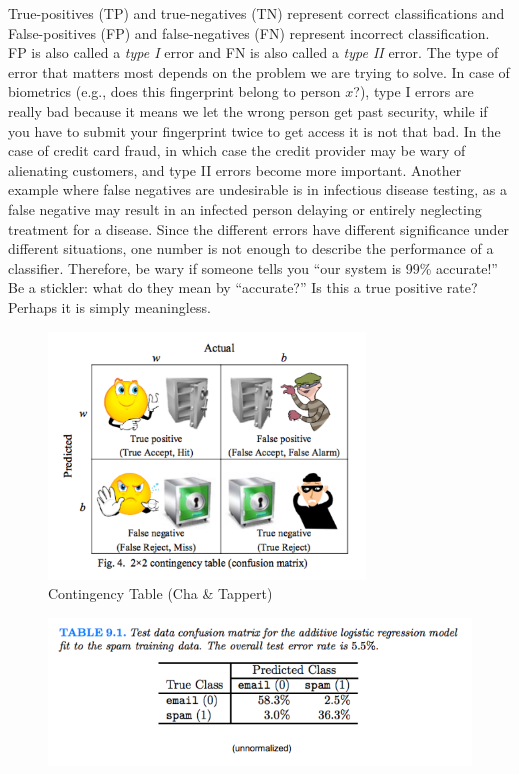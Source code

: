 \documentclass[a4paper]{article}
\begin{document}
True-positives (TP) and true-negatives (TN) represent correct classifications and False-positives (FP) and false-negatives (FN) represent incorrect classification. FP is also called a \textit{type I} error and FN is also called a \textit{type II} error. The type of error that matters most depends on the problem we are trying to solve. In case of biometrics (e.g., does this fingerprint belong to person $x$?), type I errors are really bad because it means we let the wrong person get past security, while if you have to submit your fingerprint twice to get access it is not that bad. In the case of credit card fraud, in which case the credit provider may be wary of alienating customers, and type II errors become more important. Another example where false negatives are undesirable is in infectious disease testing, as a false negative may result in an infected person delaying or entirely neglecting treatment for a disease.  
Since the different errors have different significance under different situations, one number is not enough to describe the performance of a classifier. Therefore, be wary if someone tells you ``our system is 99\% accurate!''  Be a stickler: what do they mean by ``accurate?''  Is this a true positive rate?  Perhaps it is simply meaningless.

\begin{figure}
\centering
\includegraphics[width=0.75\textwidth]{ChaTappertFig.png}
\caption{\label{contingency_table}Contingency Table (Cha \& Tappert)}
\end{figure}

\begin{figure}
\centering
\includegraphics[width=1.0\textwidth]{HTFtable9_1.png}
\label{spam}
\end{figure}
\end{document}
